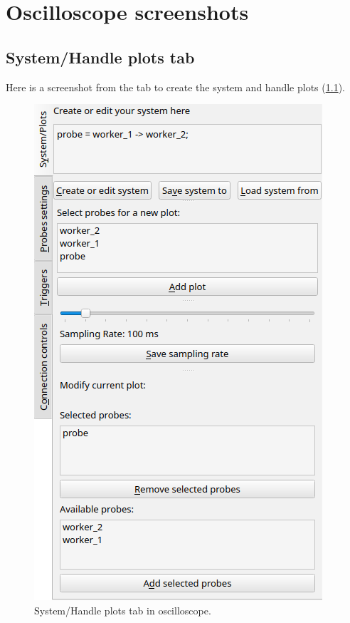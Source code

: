 \chapter{Oscilloscope screenshots}

\section{System/Handle plots tab} \label{app:sidetab_ex}
    Here is a screenshot from the tab to create the system and handle plots (\cref{fig:sidetab_ex}).

    \begin{figure}[H]
        \begin{center}
            \includegraphics[scale = 0.4]{img/new_sys_cre.png}
        \end{center}
        \caption{System/Handle plots tab in oscilloscope.}
        \label{fig:sidetab_ex}
    \end{figure}


